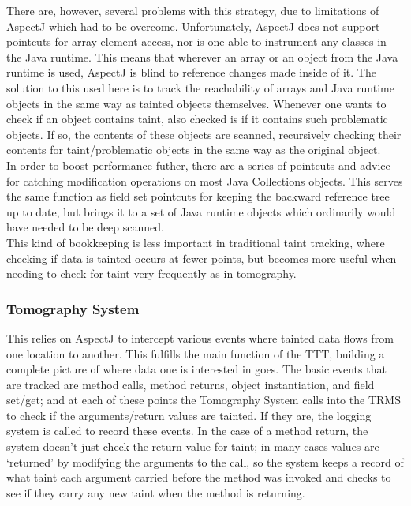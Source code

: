 \documentclass[msc,oneside]{ubcthesis}
\begin{document}
There are, however, several problems with this strategy, due to limitations of AspectJ which had to be overcome. Unfortunately, AspectJ does not support pointcuts for array element access, nor is one able to instrument any classes in the Java runtime. This means that wherever an array or an object from the Java runtime is used, AspectJ is blind to reference changes made inside of it. The solution to this used here is to track the reachability of arrays and Java runtime objects in the same way as tainted objects themselves. Whenever one wants to check if an object contains taint, also checked is if it contains such problematic objects. If so, the contents of these objects are scanned, recursively checking their contents for taint/problematic objects in the same way as the original object.\\

In order to boost performance futher, there are a series of pointcuts and advice for catching modification operations on most Java Collections objects. This serves the same function as field set pointcuts for keeping the backward reference tree up to date, but brings it to a set of Java runtime objects which ordinarily would have needed to be deep scanned.\\

This kind of bookkeeping is less important in traditional taint tracking, where checking if data is tainted occurs at fewer points, but becomes more useful when needing to check for taint very frequently as in tomography.

\subsubsection{Tomography System} 
\label{subsub:trms}
This relies on AspectJ to intercept various events where tainted data flows from one location to another. This fulfills the main function of the TTT, building a complete picture of where data one is interested in goes. The basic events that are tracked are method calls, method returns, object instantiation, and field set/get; and at each of these points the Tomography System calls into the TRMS to check if the arguments/return values are tainted. If they are, the logging system is called to record these events. In the case of a method return, the system doesn't just check the return value for taint; in many cases values are `returned' by modifying the arguments to the call, so the system keeps a record of what taint each argument carried before the method was invoked and checks to see if they carry any new taint when the method is returning. \\
\end{document}
